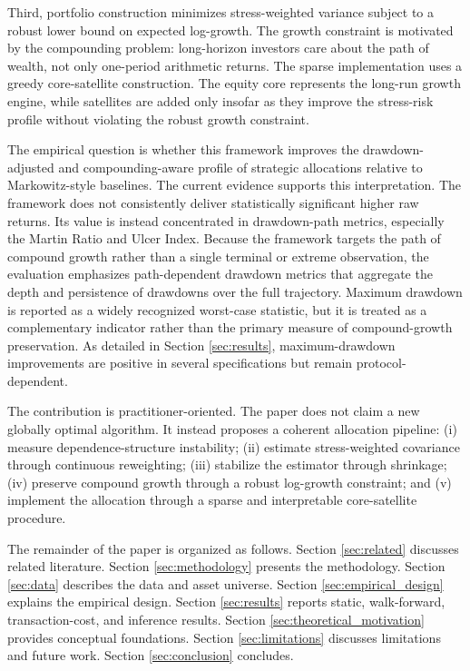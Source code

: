 \documentclass[11pt]{article}
\begin{document}
Third, portfolio construction minimizes stress-weighted variance subject to a robust lower bound on expected log-growth. The growth constraint is motivated by the compounding problem: long-horizon investors care about the path of wealth, not only one-period arithmetic returns. The sparse implementation uses a greedy core-satellite construction. The equity core represents the long-run growth engine, while satellites are added only insofar as they improve the stress-risk profile without violating the robust growth constraint.

The empirical question is whether this framework improves the drawdown-adjusted and compounding-aware profile of strategic allocations relative to Markowitz-style baselines. The current evidence supports this interpretation. The framework does not consistently deliver statistically significant higher raw returns. Its value is instead concentrated in drawdown-path metrics, especially the Martin Ratio and Ulcer Index. Because the framework targets the path of compound growth rather than a single terminal or extreme observation, the evaluation emphasizes path-dependent drawdown metrics that aggregate the depth and persistence of drawdowns over the full trajectory. Maximum drawdown is reported as a widely recognized worst-case statistic, but it is treated as a complementary indicator rather than the primary measure of compound-growth preservation. As detailed in Section \ref{sec:results}, maximum-drawdown improvements are positive in several specifications but remain protocol-dependent.

The contribution is practitioner-oriented. The paper does not claim a new globally optimal algorithm. It instead proposes a coherent allocation pipeline: (i) measure dependence-structure instability; (ii) estimate stress-weighted covariance through continuous reweighting; (iii) stabilize the estimator through shrinkage; (iv) preserve compound growth through a robust log-growth constraint; and (v) implement the allocation through a sparse and interpretable core-satellite procedure.

The remainder of the paper is organized as follows. Section \ref{sec:related} discusses related literature. Section \ref{sec:methodology} presents the methodology. Section \ref{sec:data} describes the data and asset universe. Section \ref{sec:empirical_design} explains the empirical design. Section \ref{sec:results} reports static, walk-forward, transaction-cost, and inference results. Section \ref{sec:theoretical_motivation} provides conceptual foundations. Section \ref{sec:limitations} discusses limitations and future work. Section \ref{sec:conclusion} concludes.
\end{document}
